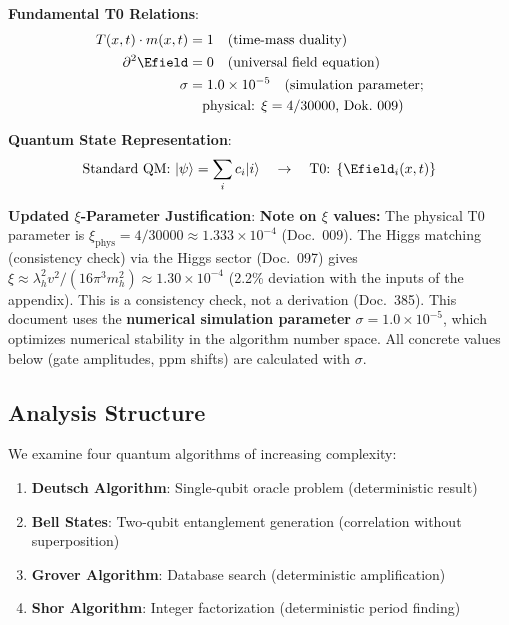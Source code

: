 	\begin{tcolorbox}[colback=blue!5!white,colframe=blue!75!black,title=Core T0 Principles with Updated $\xi$ Parameter]
		\textbf{Fundamental T0 Relations}:
\begin{align}
	T(x,t) \cdot m(x,t) &= 1 \quad \text{(time-mass duality)} \\
	\partial^2 \Efield &= 0 \quad \text{(universal field equation)} \\
	\sigma &= 1.0 \times 10^{-5} \quad \text{(simulation parameter;}\\
	& \quad \text{physical: $\xi = 4/30000$, Dok.~009)}
\end{align}
		
		\textbf{Quantum State Representation}:
		\begin{equation}
			\text{Standard QM: } |\psi\rangle = \sum_i c_i |i\rangle \quad \rightarrow \quad \text{T0: } \{\Efield_i(x,t)\}
		\end{equation}
		
		\textbf{Updated $\xi$-Parameter Justification}:
		\textbf{Note on $\xi$ values:} The physical T0 parameter is $\xi_{\text{phys}} = 4/30000 \approx 1.333 \times 10^{-4}$ (Doc.~009). The Higgs matching (consistency check) via the Higgs sector (Doc.~097) gives $\xi \approx \lambda_h^2 v^2/(16\pi^3 m_h^2) \approx 1.30 \times 10^{-4}$ (2.2\% deviation with the inputs of the appendix). This is a consistency check, not a derivation (Doc.~385). This document uses the \textbf{numerical simulation parameter} $\sigma = 1.0 \times 10^{-5}$, which optimizes numerical stability in the algorithm number space. All concrete values below (gate amplitudes, ppm shifts) are calculated with $\sigma$.
	\end{tcolorbox}
	
	\subsection{Analysis Structure}
	
	We examine four quantum algorithms of increasing complexity:
	
	\begin{enumerate}
		\item \textbf{Deutsch Algorithm}: Single-qubit oracle problem (deterministic result)
		\item \textbf{Bell States}: Two-qubit entanglement generation (correlation without superposition)
		\item \textbf{Grover Algorithm}: Database search (deterministic amplification)
		\item \textbf{Shor Algorithm}: Integer factorization (deterministic period finding)
	\end{enumerate}
	
